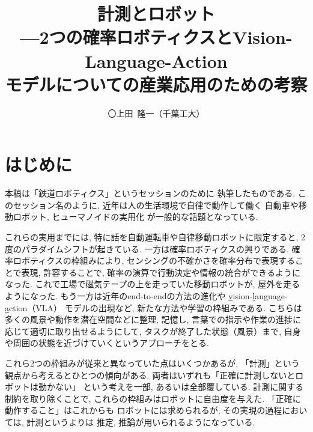 \documentclass[twocolumn]{jarticle} %
\begin{document}
\title{計測とロボット\\
---2つの確率ロボティクスとVision-Language-Action\\
モデルについての産業応用のための考察}
\author{〇上田\ 隆一（千葉工大）}

\setlength{\baselineskip}{4.4mm}	%
\maketitle
\thispagestyle{empty}
\pagestyle{empty}

\section{はじめに}

本稿は「鉄道ロボティクス」というセッションのために
執筆したものである. 
このセッション名のように, 
近年は人の生活環境で自律で動作して働く
自動車や移動ロボット, ヒューマノイドの実用化
が一般的な話題となっている. 

これらの実用までには, 
特に話を自動運転車や自律移動ロボットに限定すると, 
2度のパラダイムシフトが起きている. 
一方は確率ロボティクス\cite{thrun2005}の興りである. 
確率ロボティクスの枠組みにより, 
センシングの不確かさを確率分布で表現することで表現, 
許容することで, 確率の演算で行動決定や情報の統合ができるようになった. 
これで工場で磁気テープの上を走っていた移動ロボットが, 
屋外を走るようになった. 
もう一方は近年のend-to-endの方法の進化や
\underline{v}ision-\underline{l}anguage-\underline{a}ction（VLA）
モデルの出現など, 
新たな方法や学習の枠組みである\cite{black2024,brohan2023}. 
こちらは多くの風景や動作を潜在空間などに整理, 記憶し\cite{kingma2014}, 
言葉での指示や作業の進捗に応じて適切に取り出せるようにして\cite{ho2021}, 
タスクが終了した状態（風景）まで, 
自身や周囲の状態を近づけていくというアプローチをとる. 

これら2つの枠組みが従来と異なっていた点はいくつかあるが, 
「計測」という観点から考えるとひとつの傾向がある. 
両者はいずれも「正確に計測しないとロボットは動かない」
という考えを一部, あるいは全部覆している. 
計測に関する制約を取り除くことで, 
これらの枠組みはロボットに自由度を与えた.
「正確に動作すること」はこれからも
ロボットには求められるが, 
その実現の過程においては, 計測というよりは
推定, 推論が用いられるようになっている. 
\end{document}
